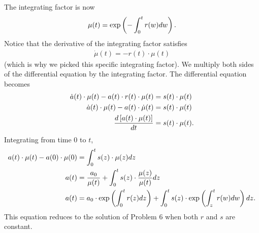 \documentclass[letterpaper,12pt,leqno]{article}
\begin{document}
The integrating factor is now
\begin{align*}
\mu (t)=\exp \bp{-\int_{0}^{t}r(w) dw} .
\end{align*}
Notice that the derivative of the integrating factor satisfies
\begin{align*}
\dot{\mu} (t)=-r(t)\cdot \mu(t)
\end{align*}
(which is why we picked this specific integrating factor). We multiply both sides of the differential equation by the integrating factor. The differential equation becomes
\begin{align*}
\dot{a}(t)\cdot \mu (t)- a(t)\cdot r(t)\cdot \mu (t)&=s(t)\cdot \mu (t)\\
\dot{a}(t)\cdot \mu (t)- a(t)\cdot  \dot{\mu} (t)&=s(t)\cdot \mu (t)\\
\frac{d \left[ a(t)\cdot \mu (t) \right]}{d t}&=s(t)\cdot \mu (t).
\end{align*}
Integrating from time $0$ to $t$, 
\begin{align*}
a(t)\cdot \mu (t)-a(0)\cdot \mu(0)&=\int_{0}^{t}s(z) \cdot \mu (z) dz\\
a(t)&=\frac{a_{0}}{\mu (t)}+\int_{0}^{t}s(z) \cdot \frac{\mu (z)}{\mu (t)} dz\\
a(t)&=a_{0}\cdot \exp \bp{\int_{0}^{t}r(z) dz}+\int_{0}^{t}s(z) \cdot  \exp \bp{\int_{z}^{t}r(w) dw} dz.
\end{align*}
This equation reduces to the solution of Problem 6 when both $r$ and $s$ are constant. 
\end{document}
